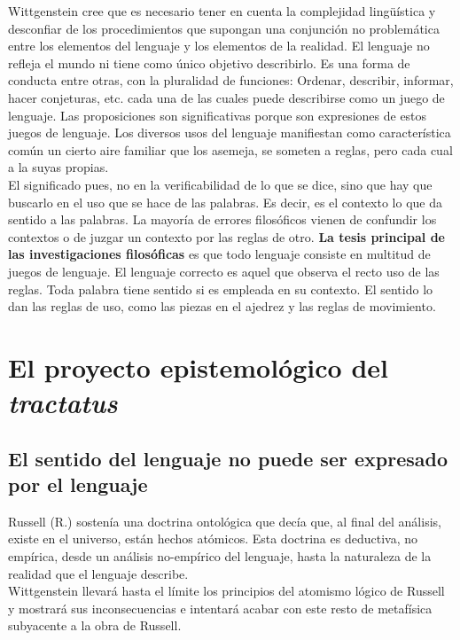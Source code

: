\documentclass[a4paper, 11pt, twocolumn, spanish]{article}
\begin{document}
Wittgenstein cree que es necesario tener en cuenta la complejidad
lingüística y desconfiar de los procedimientos que supongan una
conjunción no problemática entre los elementos del lenguaje y los
elementos de la realidad. El lenguaje no refleja el mundo ni tiene
como único objetivo describirlo. Es una forma de conducta entre otras,
con la pluralidad de funciones: Ordenar, describir, informar, hacer
conjeturas, etc. cada una de las cuales puede describirse como un
juego de lenguaje. Las proposiciones son significativas porque son
expresiones de estos juegos de lenguaje. Los diversos usos del
lenguaje manifiestan como característica común un cierto aire familiar
que los asemeja, se someten a reglas, pero cada cual a la suyas
propias.\\

El significado pues, no en la verificabilidad de lo que se dice, sino
que hay que buscarlo en el uso que se hace de las palabras. Es decir,
es el contexto lo que da sentido a las palabras. La mayoría de errores
filosóficos vienen de confundir los contextos o de juzgar un contexto
por las reglas de otro. \textbf{La tesis principal de las investigaciones
filosóficas} es que todo lenguaje consiste en multitud de juegos de
lenguaje. El lenguaje correcto es aquel que observa el recto uso de
las reglas. Toda palabra tiene sentido si es empleada en su
contexto. El sentido lo dan las reglas de uso, como las piezas en el
ajedrez y las reglas de movimiento.

\section{El proyecto epistemológico del \emph{tractatus}}
\label{sec:org98b5db7}
\subsection{El sentido del lenguaje no puede ser expresado por el lenguaje}
\label{sec:org8e7900f}
Russell (R.) sostenía una doctrina ontológica que decía que, al final
del análisis, existe en el universo, están hechos atómicos. Esta
doctrina es deductiva, no empírica, desde un análisis no-empírico del
lenguaje, hasta la naturaleza de la realidad que el lenguaje
describe.\\
Wittgenstein llevará hasta el límite los principios del atomismo
lógico de Russell y mostrará sus inconsecuencias e intentará acabar
con este resto de metafísica subyacente a la obra de Russell.\\
\end{document}
